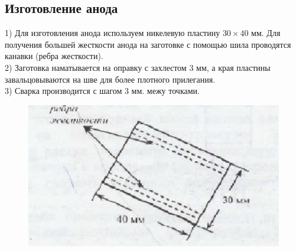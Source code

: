 \documentclass[11pt]{article}
\begin{document}
\subsection{Изготовление анода}
 1) Для изготовления анода используем никелевую пластину $30 \times 40$ мм. Для получения большей жесткости анода на заготовке с помощью шила проводятся канавки (ребра жесткости).\\
  2) Заготовка наматывается на оправку с захлестом $3$ мм, а края пластины завальцовываются на шве для более плотного прилегания.\\
  3) Сварка производится с шагом $3$ мм. межу точками.\\
\begin{figure}[h]
\begin{center}
\includegraphics[width=13cm]{заготовка анода.jpg}
\end{center}
\end{figure}
\end{document}

